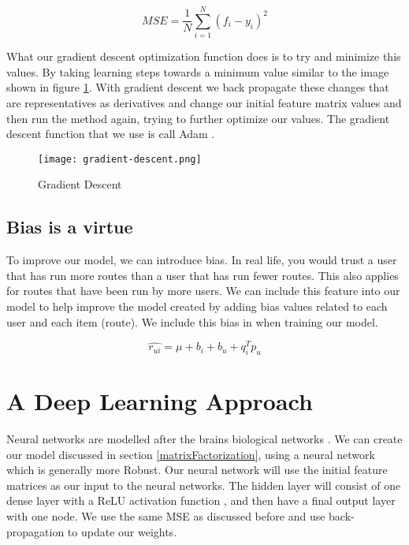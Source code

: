 \begin{equation} \label{eqn:mseLossFunction}
    MSE = \frac{1}{N}\sum_{i=1}^{N}{({f_i}-{y_i})}^2 
\end{equation}

What our gradient descent optimization function does is to try and minimize this values. By taking learning steps towards a minimum value similar to the image shown in figure \ref{fig:gradientDescent}. With gradient descent we back propagate these changes that are representatives as derivatives and change our initial feature matrix values and then run the method again, trying to further optimize our values. The gradient descent function that we use is call Adam \cite{kingma2014adam}.

\begin{figure}[ht]
    \centering
    \texttt{[image: gradient-descent.png]}
    \caption{Gradient Descent}
    \label{fig:gradientDescent}
\end{figure}

\subsection{Bias is a virtue}
To improve our model, we can introduce bias. In real life, you would trust a user that has run more routes than a user that has run fewer routes. This also applies for routes that have been run by more users. We can include this feature into our model to help improve the model created by adding bias values related to each user and each item (route). We include this bias in when training our model.

\begin{equation}
    \hat{r_{ui}} = \mu + b_i + b_u + {q^{T}_{i}}{p_u}
\end{equation}

\section{A Deep Learning Approach} \label{neuralNetwork}
Neural networks are modelled after the brains biological networks \cite{van2018artificial}. We can create our model discussed in section \ref{matrixFactorization}, using a neural network which is generally more Robust. Our neural network will use the initial feature matrices as our input to the neural networks. The hidden layer will consist of one dense layer with a ReLU activation function \cite{li2017convergence}, and then have a final output layer with one node. We use the same MSE as discussed before and use back-propagation to update our weights.

